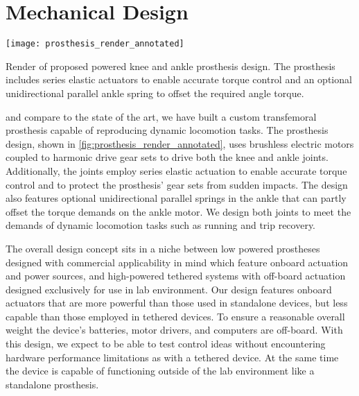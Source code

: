 \section{Mechanical Design}\label{sec:pros_mech_design}
\begin{marginfigure}[1.25in]
    \centering
    \texttt{[image: prosthesis\_render\_annotated]}
    \caption[Render of proposed powered knee and ankle prosthesis design]{Render
    of proposed powered knee and ankle prosthesis design. The prosthesis
    includes series elastic actuators to enable accurate torque control and an
    optional unidirectional parallel ankle spring to offset the required angle
    torque.}\label{fig:prosthesis_render_annotated}
\end{marginfigure}

 and compare to the state of
the art, we have built a custom transfemoral prosthesis capable of reproducing
dynamic locomotion tasks. The prosthesis design, shown in
\cref{fig:prosthesis_render_annotated}, uses brushless electric motors coupled
to harmonic drive gear sets to drive both the knee and ankle joints.
Additionally, the joints employ series elastic actuation to enable accurate
torque control and to protect the prosthesis' gear sets from sudden impacts.
The design also features optional unidirectional parallel springs in the ankle
that can partly offset the torque demands on the ankle motor.  We design both
joints to meet the demands of dynamic locomotion tasks such as running and trip
recovery.

The overall design concept sits in a niche between low powered prostheses
designed with commercial applicability in mind
\citep{sup2007design,sup2009preliminary,lawson2014robotic,rouse2015design,
martinez2011antagonistic} which feature onboard actuation and power sources, and
high-powered tethered systems \citep{caputo2013experimental,
caputo2015informing} with off-board actuation designed exclusively for use in
lab environment. Our design features onboard actuators that are more powerful
than those used in standalone devices, but less capable than those employed in
tethered devices. To ensure a reasonable overall weight the device's batteries,
motor drivers, and computers are off-board. With this design, we expect to be
able to test control ideas without encountering hardware performance limitations
as with a tethered device. At the same time the device is capable of functioning
outside of the lab environment like a standalone prosthesis.

